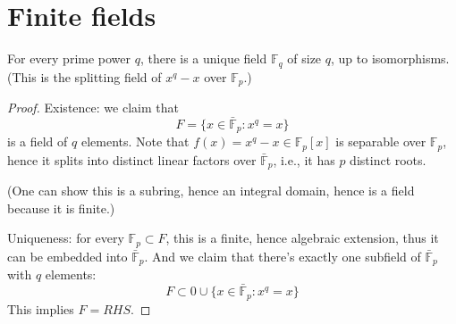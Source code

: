 \documentclass[openany]{book}
\newcommand{\Z}{\mathbb{Z}}
\newcommand{\F}{\mathbb{F}}
\begin{document}


\section{Finite fields}



\begin{prop}
    For every prime power $q$, there is a unique field $\F_q$ of size $q$, up to isomorphisms. (This is the splitting field of $x^q-x$ over $\F_p$.)
\end{prop}

\begin{proof}
    Existence: we claim that 
    \begin{equation*}
        F=\{x\in\bar{\F}_p: x^q=x\}
    \end{equation*}
    is a field of $q$ elements. Note that $f(x)=x^q-x\in\F_p[x]$ is separable over $\F_p$, hence it splits into distinct linear factors over $\bar{\F}_p$, i.e., it has $p$ distinct roots.

    (One can show this is a subring, hence an integral domain, hence is a field because it is finite.) 

    Uniqueness: for every $\F_p\subset F$, this is a finite, hence algebraic extension, thus it can be embedded into $\bar{\F}_p$. And we claim that there's exactly one subfield of $\bar{\F}_p$ with $q$ elements:
    \begin{equation*}
        F\subset 0\cup\{x\in\bar{\F}_p: x^q=x\}
    \end{equation*}
    This implies $F=RHS$.
    
    
    

\end{proof}
\end{document}
